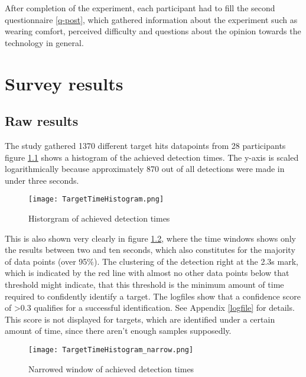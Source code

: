             After completion of the experiment, each participant had to fill the second questionnaire \ref*{q-post}, which gathered information about the experiment such as wearing comfort, perceived difficulty and questions about the opinion towards the technology in general. 

    \chapter{Survey results}

        \section{Raw results}

            The study gathered 1370 different target hits datapoints from 28 participants figure \ref*{time-hist} shows a histogram of the achieved detection times. The y-axis is scaled logarithmically because approximately 870 out of all detections were made in under three seconds. 

            \begin{figure}[h]     %
                \centering
                \texttt{[image: TargetTimeHistogram.png]} 
                \caption{Historgram of achieved detection times}\label{time-hist}
            \end{figure}    
            
            This is also shown very clearly in figure \ref*{time-hist-narrow}, where the time windows shows only the results between two and ten seconds, which also constitutes for the majority of data points (over 95\%). The clustering of the detection right at the 2.3s mark, which is indicated by the red line with almost no other data points below that threshold might indicate, that this threshold is the minimum amount of time required to confidently identify a target. The logfiles show that a confidence score of >0.3 qualifies for a successful identification. See Appendix \ref*{logfile} for details. This score is not displayed for targets, which are identified under a certain amount of time, since there aren't enough samples supposedly.

            \begin{figure}[h]     %
                \centering
                \texttt{[image: TargetTimeHistogram\_narrow.png]} 
                \caption{Narrowed window of achieved detection times}\label{time-hist-narrow}
            \end{figure} 


